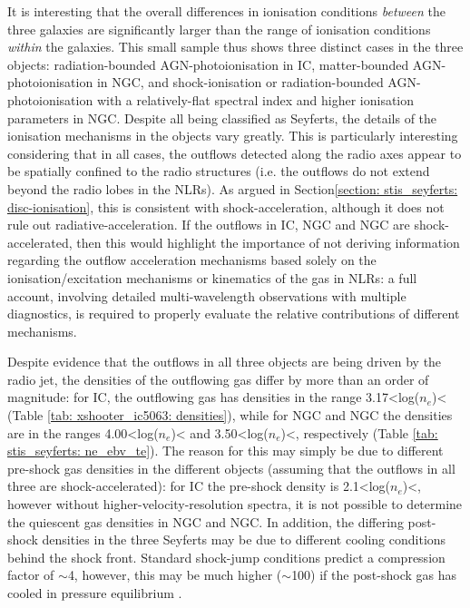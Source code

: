 It is interesting that the overall differences in ionisation conditions \textit{between} the three galaxies are significantly larger than the range of ionisation conditions \textit{within} the galaxies. This small sample thus shows three distinct cases in the three objects: radiation-bounded AGN-photoionisation in IC, matter-bounded AGN-photoionisation in NGC, and shock-ionisation or radiation-bounded AGN-photoionisation with a relatively-flat spectral index and higher ionisation parameters in NGC. Despite all being classified as Seyferts, the details of the ionisation mechanisms in the objects vary greatly. This is particularly interesting considering that in all cases, the outflows detected along the radio axes appear to be spatially confined to the radio structures (i.e. the outflows do not extend beyond the radio lobes in the NLRs). As argued in Section\;\ref{section: stis_seyferts: disc-ionisation}, this is consistent with shock-acceleration, although it does not rule out radiative-acceleration. If the outflows in IC, NGC and NGC are shock-accelerated, then this would highlight the importance of not deriving information regarding the outflow acceleration mechanisms based solely on the ionisation/excitation mechanisms or kinematics of the gas in NLRs: a full account, involving detailed multi-wavelength observations with multiple diagnostics, is required to properly evaluate the relative contributions of different mechanisms. 

Despite evidence that the outflows in all three objects are being driven by the radio jet, the densities of the outflowing gas differ by more than an order of magnitude: for IC, the outflowing gas has densities in the range 3.17\;\textless\;log($n_e$\;[cm$^{-3}$])\;\textless{} (Table \ref{tab: xshooter_ic5063: densities}), while for NGC and NGC the densities are in the ranges 4.00\;\textless\;log($n_e$\;[cm$^{-3}$])\;\textless{} and 3.50\;\textless\;log($n_e$\;[cm$^{-3}$])\;\textless{}, respectively (Table \ref{tab: stis_seyferts: ne_ebv_te}). The reason for this may simply be due to different pre-shock gas densities in the different objects (assuming that the outflows in all three are shock-accelerated): for IC the pre-shock density is 2.1\;\textless\;log($n_e$\;[cm$^{-3}$])\;\textless{}, however without higher-velocity-resolution spectra, it is not possible to determine the quiescent gas densities in NGC and NGC. In addition, the differing post-shock densities in the three Seyferts may be due to different cooling conditions behind the shock front. Standard shock-jump conditions predict a compression factor of $\sim$4, however, this may be much higher ($\sim$100) if the post-shock gas has cooled in pressure equilibrium \citep{Sutherland2017, Santoro2018}.

